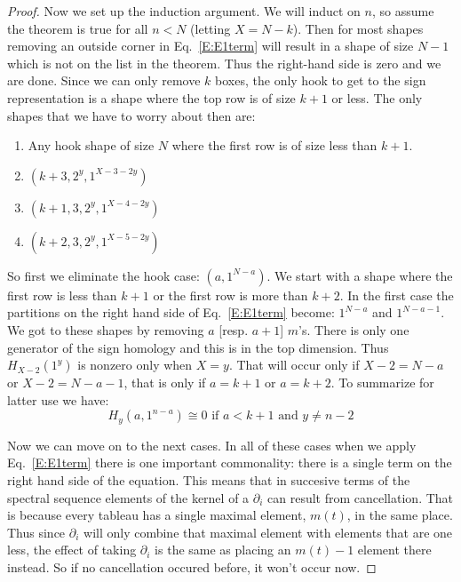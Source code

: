 \documentclass{amsart}
\begin{document}
\begin{proof}
  Now we set up the induction argument. We will induct on $n$, so assume the theorem is true for all $n < N$ 
  (letting $X=N-k$). Then for most
  shapes removing an outside corner in Eq.~\ref{E:E1term} will result in a shape of size $N-1$ which is not on the
  list in the theorem. Thus the right-hand side is zero and we are done. Since we can only remove $k$ boxes, the only
  hook to get to the sign representation is a shape where the top row is of size $k+1$ or less. 
  The only shapes that we have to worry about then
  are: 
  \begin{enumerate}
    \item Any hook shape of size $N$ where the first row is of size less than $k+1$.
    \item $(k+3, 2^y, 1^{X-3-2y})$
    \item $(k+1, 3, 2^y, 1^{X-4-2y})$
    \item $(k+2, 3, 2^y, 1^{X-5-2y})$
  \end{enumerate}

  So first we eliminate the hook case: $(a, 1^{N-a})$. 
  We start with a shape where the first row is less than $k+1$ or
  the first row is more than $k+2$. In the first case the partitions on the right hand side of Eq.~\ref{E:E1term} 
   become: $1^{N-a}$ and $1^{N-a-1}$. We got to these shapes
  by removing $a$ [resp. $a+1$] $m$'s. There is only one generator of the sign homology and this is in the top dimension.
  Thus $H_{X-2}(1^y)$ is nonzero only when $X=y$. That will occur only if $X-2 = N-a$ or $X-2 = N-a-1$, that is only if 
  $a= k+1$ or $a=k+2$. To summarize for latter use we have:
  \begin{equation} \label{E:smallhook}
    H_y(a, 1^{n-a}) \cong 0 \mbox{ if $a < k+1$ and $y \ne n-2$}
  \end{equation}

  Now we can move on to the next cases. In all of these cases when we apply Eq.~\ref{E:E1term} there is one 
  important commonality: there is a single term on the right hand side of the equation. This means that in succesive terms
  of the spectral sequence elements of the kernel of a $\partial_i$ can result from cancellation. That is because every 
  tableau has a single maximal element, $m(t)$, in the same place. Thus since $\partial_i$ will only combine that maximal element
  with elements that are one less, the effect of taking $\partial_i$ is the same as placing an $m(t)-1$ element there 
  instead. So if no cancellation occured before, it won't occur now.


\end{proof}
\end{document}
